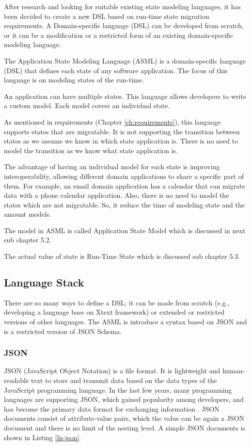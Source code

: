 After research and looking for suitable existing state modeling languages, it has been decided to create a new DSL based on run-time state migration requirements.
A Domain-specific language (DSL) can be developed from scratch, or it can be a modification or a restricted form of an existing domain-specific modeling language.

The Application State Modeling Language (ASML) is a domain-specific language  (DSL) that defines each state of any software application.
The focus of this language is on modeling states of the run-time.

An application can have multiple states.
This language allows developers to write a custom model.
Each model covers an individual state. 

As mentioned in requirements (Chapter \ref{ch:requirements}), this language supports states that are migratable.
It is not supporting the transition between states as we assume we know in which state application is. There is no need to model the transition as we know what state application is.

The advantage of having an individual model for each state is improving interoperability, allowing different domain applications to share a specific part of them.
For example, an email domain application has a calendar that can migrate data with a phone calendar application.
Also, there is no need to model the states which are not migratable. So, it reduce the time of modeling state and the amount models. 

The model in ASML is called Application State Model which is discussed in next sub chapter 5.2.

The actual value of state is Run-Time State which is discussed sub chapter 5.3.

\subsection{Language Stack}
There are so many ways to define a DSL; it can be made from scratch (e.g., developing a language base on Xtext framework) or extended or restricted versions of other languages. The ASML is introduce a syntax based on JSON and is a restricted version of JSON Schema.

\subsubsection{JSON}
JSON (JavaScript Object Notation) is a file format. It is lightweight and human-readable text to store and transmit data based on the data types of the JavaScript programming language. In the last few years, many programming languages are supporting JSON, which gained popularity among developers, and has become the primary data format for exchanging information \cite{json-schema}. JSON documents consist of attribute-value pairs, which the value can be again a JSON document and there is no limit of the nesting level. A simple JSON documents is shown in Listing \ref{lis:json}.

